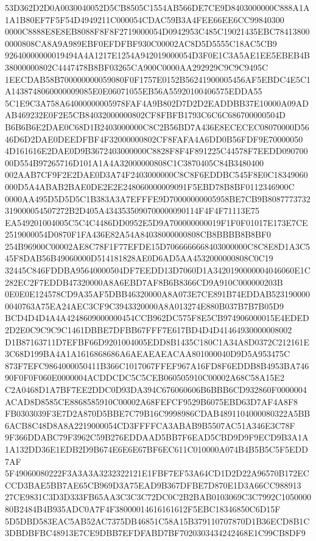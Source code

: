 \documentclass[UTF8,fontset=fandol,zihao=-4,a4paper]{ctexart}
\begin{document}
{{53D362D2D0A0030040052D5CB8505C1554AB566DE7CE9D8403000000C888A1A1A1B80EF7F5F54D4949211C000054CDAC59B3A4FEE66EE6CC99840300
0000C8888E8E8EB8088F8F8F2719000054D0942953C485C19021435EBC784138000000808CA8A9A989EBF0EFDFBF930C00002AC8D5D5555C18AC5CB9
92640000000019494A4A1217E1254A942019000054D3F0E1C3A5AE1EE5EBEB4B38000000802C4447478B8BF03265CA900C0000AA292929C9C9C9495C
1EECDAB58B700000000059080F0F1757E0152B56241900005456AF5EBDC4E5C1A1438748060000009085E0E06071055EB56A55920100406575EDDA55
5C1E9C3A758A64000000005978FAF4A9B802D7D2D2EADDBB37E10000A09ADAB469232E0F2E5CB84032000000802CF8FBFB1793C6C6C686700000504D
B6B6B6E2DAE0C68D1B2403000000C8C2B56BD7A436E8ECECEC08070000D5646D6D2DAE0DEEDFBF4F32000000802CF8FAFA4A6DD0B56FDF9E70000050
4D161616E2DAE0D9B3672403000000C8828F8F4F891225C44578F7EEDD09070000D554B97265716D101A1A4A32000000808C1C3870405C84B3480400
002AAB7CF9F2E2DAE0D3A74F2403000000C8C8F6EDDBC545F8E0C18349060000D5A4ABAB2BAE0DE2E2E248060000009091F5EBD78B8BF0112346900C
0000AA495D5D5D5C1B383A3A7EFFFE9D70000000005958BE7CB9B8087773732319000054507272B2D405A4343535090700000090114F4F4F71113E75
EA549201004005C5C4C4486DD0952E5D9A700000000019F1F0F01017E173E7CE2519000054D0870F1FA436E82A54A84038000000808CB8BBBB8B8BF0
254B96900C00002AE8C78F1F77EFDE15D7066666668403000000C8C8E8D1A3C545F8DAB56B49060000D514181828AE0D6AD5AA4532000000808C0C19
32445C846FDDBA95640000504DF7EEDD13D7060D1A3420190000004046060E1C282EC2F7EDDB47320000A8A6EBD7AF8B6B8366CD9A910C000000203B
0E0E0E124578CD9A35AF5DBB46320000A8A073E7CE891B74EDDAB5231900000040763A75EA24AEC3CF9C3943320000A8A013274E880B037B7B7B05D9
BCD4D4D4A4A4248609000000454CCB962DC575F8E5CB974906000015E4EDED2D2E0C9C9C9C1461DBBE7DFBB67FFF7E617BD4D4D41464930000008002
D1B87163711D7EFBF66D9201004005EDD8B1435C180C1A34A8D0372C212161E3C68D199BA4A1A1616868686A6AEAEAEACAA801000040D9D5A953475C
873F7EFC9864000050411B366C1017067FFEF967A16FD8F6EDDB8B4953BA74690F0F0F060E0000004ACDDCDC5C5CEB060505910C00002A68C58A15E2
C2A0468D1A7BF7EE2DDC0D93DA394C676060606B6BBB6CD932860F0000004ACAD8D8585CE8868585910C00002A68FEFCF9529B6075EBD63D7AF4A8F8
FB0303039F3E7D2A870D5BBE7C79B16C9998986CDAB4891104000080322A5BB6ACB8C48D8A8A2219000054CD3FFFFCA3ABAB9B5507AC51A346E3C78F
9F366DDABC79F3962C59B276EDDAAD5BB7F6EAD5CBD9D9F9ECD9B3A1A1A132DD36E1EDB2D9B674E6E6E67BF6EC611C010000A074B4B5B5C5F5EDD7AF
5F49060080222F3A3A3A3232322121E1FBF7EF53A64CD1D2D22A96570B172ECCCD3BAE5BB7AE65CB969D3A75EAD9B367DFBE7D870E1D3A66CC988913
27CE9831C3D3D333FB65AA3C3C3C72DC0C2B2BAB0103069C3C7992C105000080B2484B4B935ADC0A7F4F38000014616161612F5EBC18346850C6D15F
5D5DBD583EAC5AB52AC7375DB46851C58A15B379110707870D1B36ECD8B1C3DBDBFBC48913E7CE9DBB7EFDFABD7BF7020303434242468E1C99CB8DF9
}}
\end{document}
